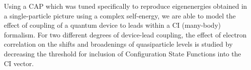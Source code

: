 Using a \acl{CAP} which was tuned specifically to reproduce eigenenergies
obtained in a single-particle picture using a complex self-energy, we are able
to model the effect of coupling of a quantum device to leads within a \ac{CI}
(many-body) formalism. For two different degrees of device-lead coupling, the
effect of electron correlation on the shifts and broadenings of quasiparticle
levels is studied by decreasing the threshold for inclusion of
Configuration State Functions into the \ac{CI} vector.
